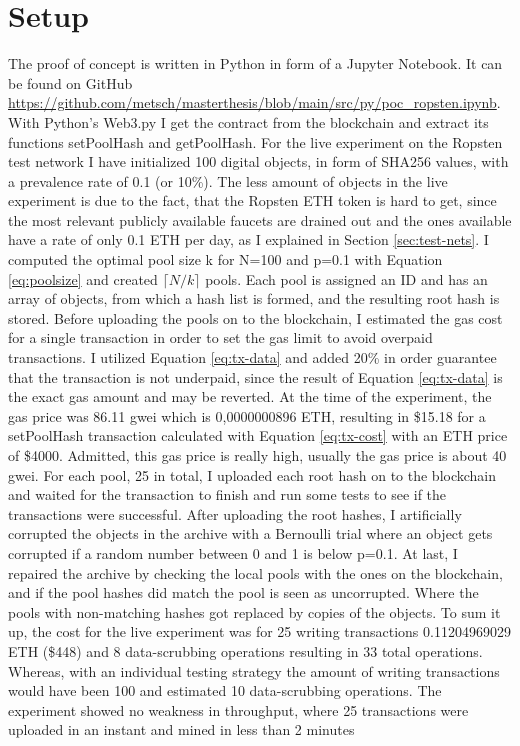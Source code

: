 \section{Setup}
The proof of concept is written in Python in form of a Jupyter Notebook. It can be found on GitHub \url{https://github.com/metsch/masterthesis/blob/main/src/py/poc_ropsten.ipynb}. With Python's Web3.py I get the contract from the blockchain and extract its functions setPoolHash and getPoolHash. For the live experiment on the Ropsten test network I have initialized 100 digital objects, in form of SHA256 values, with a prevalence rate of 0.1 (or 10\%). The less amount of objects in the live experiment is due to the fact, that the Ropsten ETH token is hard to get, since the most relevant publicly available faucets are drained out and the ones available have a rate of only 0.1 ETH per day, as I explained in Section \ref{sec:test-nets}. I computed the optimal pool size k for N=100 and p=0.1 with Equation \ref{eq:poolsize} and created $\lceil N/k \rceil$ pools. Each pool is assigned an ID and has an array of objects, from which a hash list is formed, and the resulting root hash is stored. 
Before uploading the pools on to the blockchain, I estimated the gas cost for a single transaction in order to set the gas limit to avoid overpaid transactions. I utilized Equation \ref{eq:tx-data} and added 20\% in order guarantee that the transaction is not underpaid, since the result of Equation \ref{eq:tx-data} is the exact gas amount and may be reverted.
At the time of the experiment, the gas price was 86.11 gwei which is 0,0000000896 ETH, resulting in \$15.18 for a setPoolHash transaction calculated with Equation \ref{eq:tx-cost} with an ETH price of \$4000. Admitted, this gas price is really high, usually the gas price is about 40 gwei. 
For each pool, 25 in total, I uploaded each root hash on to the blockchain and waited for the transaction to finish and run some tests to see if the transactions were successful.
After uploading the root hashes, I artificially corrupted the objects in the archive with a Bernoulli trial where an object gets corrupted if a random number between 0 and 1 is below p=0.1. At last, I repaired the archive by checking the local pools with the ones on the blockchain, and if the pool hashes did match the pool is seen as uncorrupted. Where the pools with non-matching hashes got replaced by copies of the objects.
To sum it up, the cost for the live experiment was for 25 writing transactions 0.11204969029 ETH (\$448) and 8 data-scrubbing operations resulting in 33 total operations. Whereas, with an individual testing strategy the amount of writing transactions would have been 100 and estimated 10 data-scrubbing operations. The experiment showed no weakness in throughput, where 25 transactions were uploaded in an instant and mined in less than 2 minutes